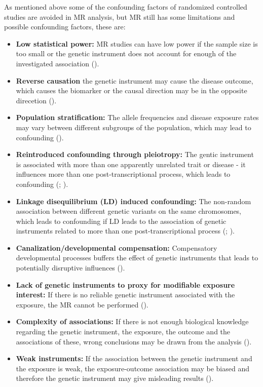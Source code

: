 \documentclass[
]{article}
\providecommand{\tightlist}{%
  \setlength{\itemsep}{0pt}\setlength{\parskip}{0pt}}
\begin{document}
As mentioned above some of the confounding factors of randomized
controlled studies are avoided in MR analysis, but MR still has some
limitations and possible confounding factors, these are:

\begin{itemize}
\tightlist
\item
  \textbf{Low statistical power:} MR studies can have low power if the
  sample size is too small or the genetic instrument does not account
  for enough of the investigated association
  ().
\item
  \textbf{Reverse causation} the genetic instrument may cause the
  disease outcome, which causes the biomarker or the causal direction
  may be in the opposite direcetion ().
\item
  \textbf{Population stratification:} The allele frequencies and disease
  exposure rates may vary between different subgroups of the population,
  which may lead to confounding ().
\item
  \textbf{Reintroduced confounding through pleiotropy:} The gentic
  instrument is associated with more than one apparently unrelated trait
  or disease - it influences more than one post-transcriptional process,
  which leads to confounding (; ).
\item
  \textbf{Linkage disequilibrium (LD) induced confounding:} The
  non-random association between different genetic variants on the same
  chromosomes, which leads to confounding if LD leads to the association
  of genetic instruments related to more than one post-transcriptional
  process (;
  ).
\item
  \textbf{Canalization/developmental compensation:} Compensatory
  developmental processes buffers the effect of genetic instruments that
  leads to potentially disruptive influences
  ().
\item
  \textbf{Lack of genetic instruments to proxy for modifiable exposure
  interest:} If there is no reliable genetic instrument associated with
  the exposure, the MR cannot be performed
  ().
\item
  \textbf{Complexity of associations:} If there is not enough biological
  knowledge regarding the genetic instrument, the exposure, the outcome
  and the associations of these, wrong conclusions may be drawn from the
  analysis ().
\item
  \textbf{Weak instruments:} If the association between the genetic
  instrument and the exposure is weak, the exposure-outcome association
  may be biased and therefore the genetic instrument may give misleading
  results ().
\end{itemize}
\end{document}
